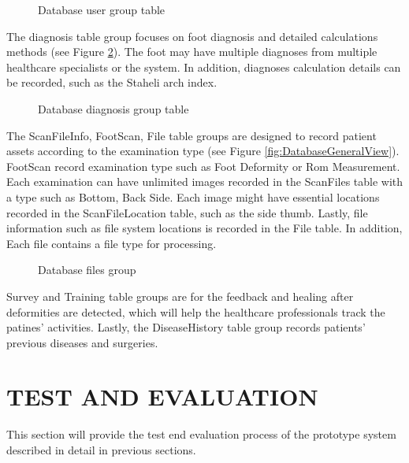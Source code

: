 \begin{figure}[htbp]
\centering
{}
\caption{Database user group table}
\label{fig:DatabaseUser}
\end{figure}

The diagnosis table group focuses on foot diagnosis and detailed calculations methods (see Figure \ref{fig:DatabaseDiagnosis}). The foot may have multiple diagnoses from multiple healthcare specialists or the system. In addition, diagnoses calculation details can be recorded, such as the Staheli arch index.

\begin{figure}[htbp]
\centering
{}
\caption{Database diagnosis group table}
\label{fig:DatabaseDiagnosis}
\end{figure}

The ScanFileInfo, FootScan, File table groups are designed to record patient assets according to the examination type (see Figure \ref{fig:DatabaseGeneralView}). FootScan record examination type such as Foot Deformity or Rom Measurement. Each examination can have unlimited images recorded in the ScanFiles table with a type such as Bottom, Back Side. Each image might have essential locations recorded in the ScanFileLocation table, such as the side thumb. Lastly, file information such as file system locations is recorded in the File table. In addition, Each file contains a file type for processing. 

\begin{figure}[htbp]
\centering
{}
\caption{Database files group}
\label{fig:DatabaseFiles}
\end{figure}

Survey and Training table groups are for the feedback and healing after deformities are detected, which will help the healthcare professionals track the patines' activities. Lastly, the DiseaseHistory table group records patients' previous diseases and surgeries. 

\section{TEST AND EVALUATION} \label{sec:StudyITestAndEvaluation}

This section will provide the test end evaluation process of the prototype system described in detail in previous sections. 

